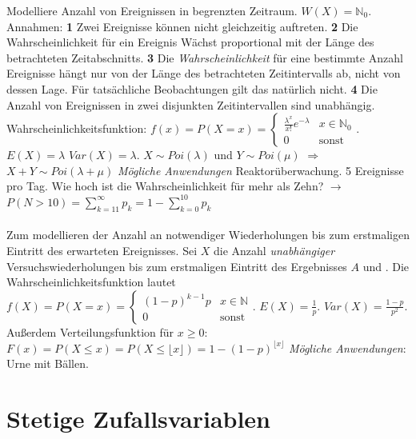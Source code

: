  Modelliere Anzahl von Ereignissen in begrenzten Zeitraum. $W(X) = \mathds{N}_0$. Annahmen: \textbf{1} Zwei Ereignisse können nicht gleichzeitig auftreten. \textbf{2} Die Wahrscheinlichkeit für ein Ereignis Wächst proportional mit der Länge des betrachteten Zeitabschnitts. \textbf{3} Die \emph{Wahrscheinlichkeit} für eine bestimmte Anzahl Ereignisse hängt nur von der Länge des betrachteten Zeitintervalls ab, nicht von dessen Lage. Für tatsächliche Beobachtungen gilt das natürlich nicht. \textbf{4} Die Anzahl von Ereignissen in zwei disjunkten Zeitintervallen sind unabhängig. Wahrscheinlichkeitsfunktion: $f(x) = P(X=x) = \begin{cases}
    \frac{\lambda^x}{x!}e^{-\lambda} & x \in \mathds{N}_0\\
    0 & \text{sonst}
\end{cases}$. $E(X) = \lambda$ $Var(X) = \lambda$. $X \sim Poi(\lambda)$ und $Y \sim Poi(\mu)$ $\Rightarrow$ $X + Y \sim Poi(\lambda + \mu)$ \emph{Mögliche Anwendungen} Reaktorüberwachung. 5 Ereignisse pro Tag. Wie hoch ist die Wahrscheinlichkeit für mehr als Zehn? $\rightarrow$ $P(N > 10) = \sum_{k=11}^\infty p_k = 1 - \sum_{k=0}^{10}p_k$ \\\\
 Zum modellieren der Anzahl an notwendiger Wiederholungen bis zum erstmaligen Eintritt des erwarteten Ereignisses. Sei $X$ die Anzahl \emph{unabhängiger} Versuchswiederholungen bis zum erstmaligen Eintritt des Ergebnisses $A$ und . Die Wahrscheinlichkeitsfunktion lautet $f(X) = P(X = x) = \begin{cases}
    (1 - p)^{k-1} p & x \in \mathds{N}\\
    0 & \text{sonst}
\end{cases}$. $E(X) = \frac{1}{p}$. $Var(X) = \frac{1-p}{p^2}$. Außerdem Verteilungsfunktion für $x \ge 0$: $F(x) = P(X \le x) = P(X \le \lfloor x\rfloor) = 1 - (1 - p)^{\lfloor x\rfloor}$ \emph{Mögliche Anwendungen}: Urne mit Bällen.




\section{Stetige Zufallsvariablen}
